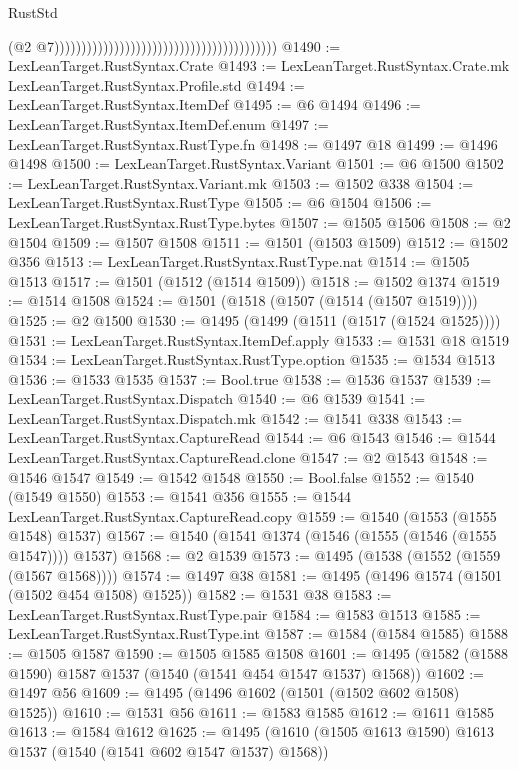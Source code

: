 \begin{lexlean}{RustStd}
\begin{coremodule}
                                                                                    (@2
                                                                                      @7)))))))))))))))))))))))))))))))))))))))))
@1490 := LexLeanTarget.RustSyntax.Crate
@1493 := LexLeanTarget.RustSyntax.Crate.mk LexLeanTarget.RustSyntax.Profile.std
@1494 := LexLeanTarget.RustSyntax.ItemDef
@1495 := @6 @1494
@1496 := LexLeanTarget.RustSyntax.ItemDef.enum
@1497 := LexLeanTarget.RustSyntax.RustType.fn
@1498 := @1497 @18
@1499 := @1496 @1498
@1500 := LexLeanTarget.RustSyntax.Variant
@1501 := @6 @1500
@1502 := LexLeanTarget.RustSyntax.Variant.mk
@1503 := @1502 @338
@1504 := LexLeanTarget.RustSyntax.RustType
@1505 := @6 @1504
@1506 := LexLeanTarget.RustSyntax.RustType.bytes
@1507 := @1505 @1506
@1508 := @2 @1504
@1509 := @1507 @1508
@1511 := @1501 (@1503 @1509)
@1512 := @1502 @356
@1513 := LexLeanTarget.RustSyntax.RustType.nat
@1514 := @1505 @1513
@1517 := @1501 (@1512 (@1514 @1509))
@1518 := @1502 @1374
@1519 := @1514 @1508
@1524 := @1501 (@1518 (@1507 (@1514 (@1507 @1519))))
@1525 := @2 @1500
@1530 := @1495 (@1499 (@1511 (@1517 (@1524 @1525))))
@1531 := LexLeanTarget.RustSyntax.ItemDef.apply
@1533 := @1531 @18 @1519
@1534 := LexLeanTarget.RustSyntax.RustType.option
@1535 := @1534 @1513
@1536 := @1533 @1535
@1537 := Bool.true
@1538 := @1536 @1537
@1539 := LexLeanTarget.RustSyntax.Dispatch
@1540 := @6 @1539
@1541 := LexLeanTarget.RustSyntax.Dispatch.mk
@1542 := @1541 @338
@1543 := LexLeanTarget.RustSyntax.CaptureRead
@1544 := @6 @1543
@1546 := @1544 LexLeanTarget.RustSyntax.CaptureRead.clone
@1547 := @2 @1543
@1548 := @1546 @1547
@1549 := @1542 @1548
@1550 := Bool.false
@1552 := @1540 (@1549 @1550)
@1553 := @1541 @356
@1555 := @1544 LexLeanTarget.RustSyntax.CaptureRead.copy
@1559 := @1540 (@1553 (@1555 @1548) @1537)
@1567 := @1540 (@1541 @1374 (@1546 (@1555 (@1546 (@1555 @1547)))) @1537)
@1568 := @2 @1539
@1573 := @1495 (@1538 (@1552 (@1559 (@1567 @1568))))
@1574 := @1497 @38
@1581 := @1495 (@1496 @1574 (@1501 (@1502 @454 @1508) @1525))
@1582 := @1531 @38
@1583 := LexLeanTarget.RustSyntax.RustType.pair
@1584 := @1583 @1513
@1585 := LexLeanTarget.RustSyntax.RustType.int
@1587 := @1584 (@1584 @1585)
@1588 := @1505 @1587
@1590 := @1505 @1585 @1508
@1601 := @1495 (@1582 (@1588 @1590) @1587 @1537 (@1540 (@1541 @454 @1547 @1537) @1568))
@1602 := @1497 @56
@1609 := @1495 (@1496 @1602 (@1501 (@1502 @602 @1508) @1525))
@1610 := @1531 @56
@1611 := @1583 @1585
@1612 := @1611 @1585
@1613 := @1584 @1612
@1625 := @1495 (@1610 (@1505 @1613 @1590) @1613 @1537 (@1540 (@1541 @602 @1547 @1537) @1568))

\end{coremodule}
\end{lexlean}
